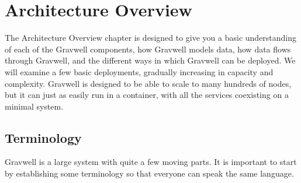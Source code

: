 \chapter{Architecture Overview}

The Architecture Overview chapter is designed to give you a basic
understanding of each of the Gravwell components, how Gravwell models
data, how data flows through Gravwell, and the different ways in which
Gravwell can be deployed. We will examine a few basic deployments,
gradually increasing in capacity and complexity. Gravwell is designed
to be able to scale to many hundreds of nodes, but it can just as easily
run in a container, with all the services coexisting on a minimal system.

\section{Terminology}

Gravwell is a large system with quite a few moving parts. It is
important to start by establishing some terminology so that everyone can
speak the same language.

